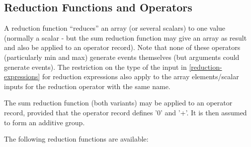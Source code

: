 \documentclass[10pt,a4paper]{report}
\def\doublelabel#1{\label{#1}}
\begin{document}
\subsection{Reduction Functions and Operators}\doublelabel{reduction-functions-and-operators}

A reduction function ``reduces'' an array (or several scalars) to one
value (normally a scalar - but the sum reduction function may give an
array as result and also be applied to an operator record). Note that
none of these operators (particularly min and max) generate events
themselves (but arguments could generate events). The restriction on the
type of the input in \ref{reduction-expressions} for reduction expressions also
apply to the array elements/scalar inputs for the reduction operator
with the same name.

The sum reduction function (both variants) may be applied to an operator
record, provided that the operator record defines '0' and '+'. It is
then assumed to form an additive group.

The following reduction functions are available:
\end{document}
